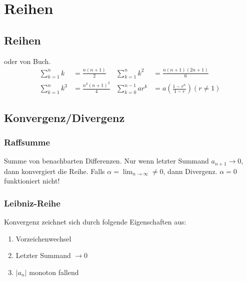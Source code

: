 \section{Reihen}

\subsection{Reihen }
oder  von Buch.
\begin{align*}
	\sum_{k=1}^n k   &= \frac{n(n+1)}{2} &
	\sum_{k=1}^n k^2 &= \frac{n(n+1)(2n+1)}{6} \\
	\sum_{k=1}^n k^3 &= \frac{n^2(n+1)^2}{4} &
	\sum_{k=0}^{n-1} ar^k &= a\left(\frac{1-r^n}{1-r}\right) (r \neq 1)
\end{align*}


\subsection{Konvergenz/Divergenz}
\subsubsection{Raffsumme}
Summe von benachbarten Differenzen. Nur wenn letzter Summand $a_{n+1} \rightarrow 0$, dann konvergiert die Reihe.
Falls $\alpha = \lim_{n \rightarrow \infty} \neq 0$, dann Divergenz. $\alpha=0$ funktioniert nicht!

\subsubsection{Leibniz-Reihe}
Konvergenz zeichnet sich durch folgende Eigenschaften aus:
\begin{enumerate}[nosep]
	\item Vorzeichenwechsel
	\item Letzter Summand $\rightarrow 0$
	\item $\left|a_n\right|$ monoton fallend
\end{enumerate}

